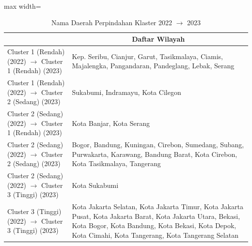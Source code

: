 \begin{table}[H]
\centering
\caption{Nama Daerah Perpindahan Klaster 2022 \(\rightarrow\) 2023} \label{tab:app1transname2022x2023}
\begin{adjustbox}{max width=\textwidth}
\begin{tabular}{|>{\centering\arraybackslash}p{4cm}|p{10cm}|}
\hline
\multicolumn{1}{|c|}{\textbf{Kategori}} & \multicolumn{1}{c|}{\textbf{Daftar Wilayah}} \\
\hline
Cluster 1 (Rendah) (2022) \(\rightarrow\) Cluster 1 (Rendah) (2023) & Kep. Seribu, Cianjur, Garut, Tasikmalaya, Ciamis, Majalengka, Pangandaran, Pandeglang, Lebak, Serang \\
\hline
Cluster 1 (Rendah) (2022) \(\rightarrow\) Cluster 2 (Sedang) (2023) & Sukabumi, Indramayu, Kota Cilegon \\
\hline
Cluster 2 (Sedang) (2022) \(\rightarrow\) Cluster 1 (Rendah) (2023) & Kota Banjar, Kota Serang \\
\hline
Cluster 2 (Sedang) (2022) \(\rightarrow\) Cluster 2 (Sedang) (2023) & Bogor, Bandung, Kuningan, Cirebon, Sumedang, Subang, Purwakarta, Karawang, Bandung Barat, Kota Cirebon, Kota Tasikmalaya, Tangerang \\
\hline
Cluster 2 (Sedang) (2022) \(\rightarrow\) Cluster 3 (Tinggi) (2023) & Kota Sukabumi \\
\hline
Cluster 3 (Tinggi) (2022) \(\rightarrow\) Cluster 3 (Tinggi) (2023) & Kota Jakarta Selatan, Kota Jakarta Timur, Kota Jakarta Pusat, Kota Jakarta Barat, Kota Jakarta Utara, Bekasi, Kota Bogor, Kota Bandung, Kota Bekasi, Kota Depok, Kota Cimahi, Kota Tangerang, Kota Tangerang Selatan \\
\hline
\end{tabular}
\end{adjustbox}
\end{table}